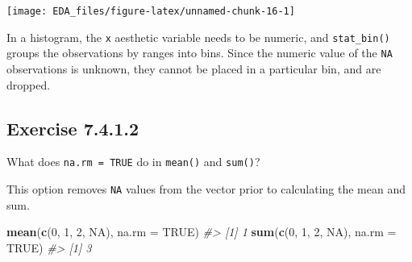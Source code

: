 \documentclass[]{book}
\newenvironment{Shaded}{\begin{snugshade}}{\end{snugshade}}
\newcommand{\CommentTok}[1]{\textcolor[rgb]{0.56,0.35,0.01}{\textit{#1}}}
\newcommand{\DataTypeTok}[1]{\textcolor[rgb]{0.13,0.29,0.53}{#1}}
\newcommand{\DecValTok}[1]{\textcolor[rgb]{0.00,0.00,0.81}{#1}}
\newcommand{\FloatTok}[1]{\textcolor[rgb]{0.00,0.00,0.81}{#1}}
\newcommand{\KeywordTok}[1]{\textcolor[rgb]{0.13,0.29,0.53}{\textbf{#1}}}
\newcommand{\NormalTok}[1]{#1}
\newcommand{\OperatorTok}[1]{\textcolor[rgb]{0.81,0.36,0.00}{\textbf{#1}}}
\newcommand{\OtherTok}[1]{\textcolor[rgb]{0.56,0.35,0.01}{#1}}
\newcommand{\StringTok}[1]{\textcolor[rgb]{0.31,0.60,0.02}{#1}}
\theoremstyle{plain}
\theoremstyle{remark}
\begin{document}
\begin{Shaded}
\end{Shaded}

\begin{center}\texttt{[image: EDA\_files/figure-latex/unnamed-chunk-16-1]} \end{center}

In a histogram, the \texttt{x} aesthetic variable needs to be numeric, and \texttt{stat\_bin()} groups the observations by ranges into bins.
Since the numeric value of the \texttt{NA} observations is unknown, they cannot be placed in a particular bin, and are dropped.

\hypertarget{exercise-7.4.1.2}{%
\subsection*{\texorpdfstring{Exercise {7.4.1.2}}{Exercise 7.4.1.2}}\label{exercise-7.4.1.2}}

What does \texttt{na.rm\ =\ TRUE} do in \texttt{mean()} and \texttt{sum()}?

This option removes \texttt{NA} values from the vector prior to calculating the mean and sum.

\begin{Shaded}
\begin{Highlighting}[]
\KeywordTok{mean}\NormalTok{(}\KeywordTok{c}\NormalTok{(}\DecValTok{0}\NormalTok{, }\DecValTok{1}\NormalTok{, }\DecValTok{2}\NormalTok{, }\OtherTok{NA}\NormalTok{), }\DataTypeTok{na.rm =} \OtherTok{TRUE}\NormalTok{)}
\CommentTok{#> [1] 1}
\KeywordTok{sum}\NormalTok{(}\KeywordTok{c}\NormalTok{(}\DecValTok{0}\NormalTok{, }\DecValTok{1}\NormalTok{, }\DecValTok{2}\NormalTok{, }\OtherTok{NA}\NormalTok{), }\DataTypeTok{na.rm =} \OtherTok{TRUE}\NormalTok{)}
\CommentTok{#> [1] 3}
\end{Highlighting}
\end{Shaded}
\end{document}
